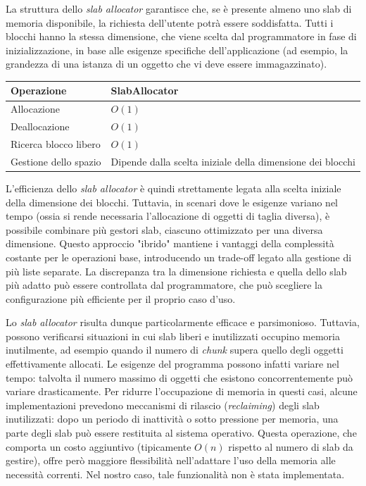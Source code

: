 La struttura dello \textit{slab allocator} garantisce che, se è presente almeno uno slab di memoria disponibile, la richiesta dell’utente potrà essere soddisfatta. Tutti i blocchi hanno la stessa dimensione, che viene scelta dal programmatore in fase di inizializzazione, in base alle esigenze specifiche dell’applicazione (ad esempio, la grandezza di una istanza di un oggetto che vi deve essere immagazzinato).

\begin{center}
\begin{tabular}{|l|p{8cm}|}
\hline
Operazione & SlabAllocator \\
\hline
Allocazione & $O(1)$ \\
Deallocazione & $O(1)$ \\
Ricerca blocco libero & $O(1)$ \\
Gestione dello spazio & Dipende dalla scelta iniziale della dimensione dei blocchi \\
\hline
\end{tabular}
\end{center}

L’efficienza dello \textit{slab allocator} è quindi strettamente legata alla scelta iniziale della dimensione dei blocchi. Tuttavia, in scenari dove le esigenze variano nel tempo (ossia si rende necessaria l’allocazione di oggetti di taglia diversa), è possibile combinare più gestori slab, ciascuno ottimizzato per una diversa dimensione. Questo approccio "ibrido" mantiene i vantaggi della complessità costante per le operazioni base, introducendo un trade-off legato alla gestione di più liste separate. La discrepanza tra la dimensione richiesta e quella dello slab più adatto può essere controllata dal programmatore, che può scegliere la configurazione più efficiente per il proprio caso d’uso.

Lo \textit{slab allocator} risulta dunque particolarmente efficace e parsimonioso. Tuttavia, possono verificarsi situazioni in cui slab liberi e inutilizzati occupino memoria inutilmente, ad esempio quando il numero di \textit{chunk} supera quello degli oggetti effettivamente allocati. Le esigenze del programma possono infatti variare nel tempo: talvolta il numero massimo di oggetti che esistono concorrentemente può variare drasticamente. Per ridurre l’occupazione di memoria in questi casi, alcune implementazioni prevedono meccanismi di rilascio (\textit{reclaiming}) degli slab inutilizzati: dopo un periodo di inattività o sotto pressione per memoria, una parte degli slab può essere restituita al sistema operativo. Questa operazione, che comporta un costo aggiuntivo (tipicamente $O(n)$ rispetto al numero di slab da gestire), offre però maggiore flessibilità nell’adattare l’uso della memoria alle necessità correnti. Nel nostro caso, tale funzionalità non è stata implementata.

